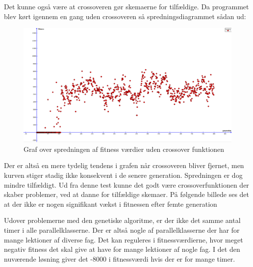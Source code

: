 Det kunne også være at crossoveren gør skemaerne for tilfældige. Da programmet blev kørt igennem en gang uden crossoveren så spredningsdiagrammet sådan ud:
\begin{figure}[!h]
\centering
\includegraphics[width=\textwidth]{partials/graphics/spredningudencrossover.png}
\caption{Graf over spredningen af fitness værdier uden crossover funktionen}
\label{fig:spredningudencrossover}
\end{figure}
Der er altså en mere tydelig tendens i grafen når crossoveren bliver fjernet, men kurven stiger stadig ikke konsekvent i de senere generation. Spredningen er dog mindre tilfældigt. Ud fra denne test kunne det godt være crossoverfunktionen der skaber problemer, ved at danne for tilfældige skemaer. 
På følgende billede ses det at der ikke er nogen signifikant vækst i fitnessen efter femte generation


Udover problemerne med den genetiske algoritme, er der ikke det samme antal timer i alle parallelklasserne. Der er altså nogle af parallelklasserne der har for mange lektioner af diverse fag. Det kan reguleres i fitnessværdierne, hvor meget negativ fitness det skal give at have for mange lektioner af nogle fag. I det den nuværende løsning giver det -8000 i fitnessværdi hvis der er for mange timer.
